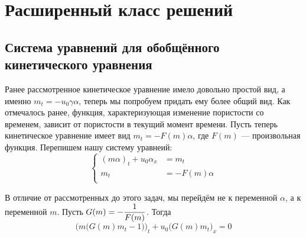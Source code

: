 \section{Расширенный класс решений}
\subsection{Система уравнений для обобщённого кинетического уравнения}
\par Ранее рассмотренное кинетическое уравнение имело довольно простой вид, а именно $m_{t} = -u_{0}\gamma \alpha$, теперь мы попробуем придать ему более общий вид. Как отмечалось ранее, функция, характеризующая изменение пористости со временем, зависит от пористости в текущий момент времени. Пусть теперь кинетическое уравнение имеет вид $m_{t} = -F(m)\alpha$, где $F(m)$ --- произвольная функция. Перепишем нашу систему уравнеий:
\begin{equation*}
\begin{cases}

(m\alpha)_{t}+ u_{0}\alpha_{x} &= m_{t}\\
m_{t} &= -F(m)\alpha\\

\end{cases}
\end{equation*}

\par В отличие от рассмотренных до этого задач, мы перейдём не к переменной $\alpha$, а к переменной $m$. Пусть $\displaystyle G(m) = -\frac{1}{F(m)}$. Тогда
$$\Big(m \big(G(m)m_{t} - 1\big)\Big)_{t} + u_{0}\big(G(m)m_{t}\big)_{x} = 0$$


